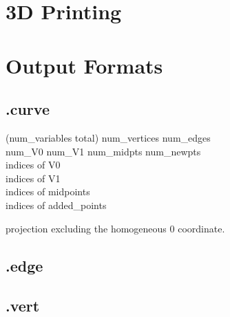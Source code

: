\documentclass[10pt]{article}
\begin{document}
\section{3D Printing}

\clearpage

\appendix
\section{Output Formats}


\subsection{.curve}


(num\_variables total) num\_vertices num\_edges \\
num\_V0 num\_V1 num\_midpts num\_newpts \\

indices of V0  \\
indices of V1  \\
indices of midpoints \\
indices of added\_points

projection excluding the homogeneous 0 coordinate.\\


\subsection{.edge}


\subsection{.vert}




%
%	
%	
%	
\end{document}
